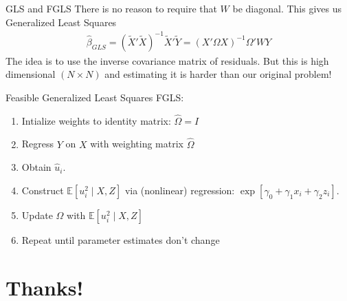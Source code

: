 \documentclass[aspectratio=169]{beamer}
\newcommand{\E}{\mathbb{E}}
\begin{document}
\begin{frame}{GLS and FGLS}
There is no reason to require that $W$ be diagonal. This gives us \alert{Generalized Least Squares}
\begin{align*}
\widehat{\beta}_{GLS} = (\tilde{X}'\tilde{X})^{-1}\tilde{X}'\tilde{Y} = (X' \Omega  X)^{-1} \Omega' W Y
\end{align*}
The idea is to use the \alert{inverse covariance matrix} of residuals. But this is high dimensional $(N \times N)$ and estimating it is harder than our original problem!

 Feasible Generalized Least Squares \alert{FGLS}:
\begin{enumerate}
\item Intialize weights to identity matrix: $\widehat{\Omega}= I$
\item Regress $Y$ on $X$ with weighting matrix $\widehat{\Omega}$
\item Obtain $\widehat{u}_i$.
\item Construct $\E[ u_i^2 \mid X, Z]$ via (nonlinear) regression: $\exp[ \gamma_0 + \gamma_1 x_{i} + \gamma_2 z_{i}]$.
\item Update $\widehat{\Omega}$ with $\E[ u_i^2 \mid X, Z]$
\item Repeat until parameter estimates don't change
\end{enumerate}
\end{frame}


\section*{Thanks!}
\end{document}
